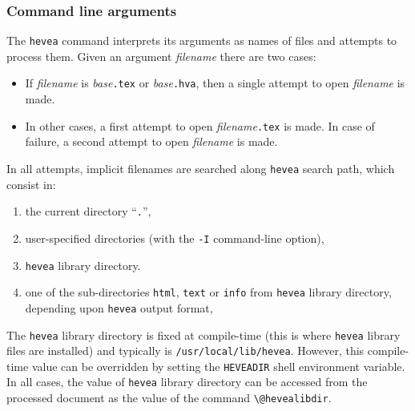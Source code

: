 \subsubsection{Command line arguments}\label{comline}
The \texttt{hevea} command interprets its arguments as names of
files and attempts to process them.
Given an argument \textit{filename} there are two cases:
\begin{itemize}
\item If \textit{filename} is \textit{base}\texttt{.tex} or
\textit{base}\texttt{.hva},
then a single attempt to open \textit{filename} is made.
\item In other cases,
a first attempt to open \textit{filename}\texttt{.tex} is made.
In case of failure, a second attempt to open  \textit{filename} is made.
\end{itemize}
\label{search:path}
In all attempts, implicit filenames are
searched along \texttt{hevea} search path, which consist in:
\begin{enumerate}
\item the current directory ``\texttt{.}'',
\item user-specified directories (with the \texttt{-I} command-line
option),
\item \texttt{hevea} library directory.
\item one of the sub-directories \texttt{html}, \texttt{text} or
\texttt{info} from \texttt{hevea} library directory, depending upon
\texttt{hevea} output format,
\end{enumerate}
The \texttt{hevea} library directory is fixed at compile-time
(this is where \texttt{hevea} library files are installed)
and typically is \texttt{/usr/local/lib/hevea}.
However, this compile-time value can be overridden
by setting the \texttt{HEVEADIR} shell environment variable.
In all cases, the value of \texttt{hevea} library directory can
be accessed from the processed document as the value of the command
\verb+\@hevealibdir+.



